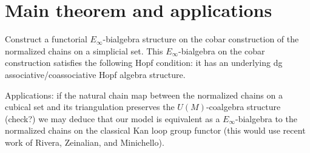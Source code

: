 \section{Main theorem and applications}

Construct a functorial $E_{\infty}$-bialgebra structure on the cobar construction of the normalized chains on a simplicial set. This $E_{\infty}$-bialgebra on the cobar construction satisfies the following Hopf condition: it has an underlying dg associative/coassociative Hopf algebra structure. 





Applications: if the natural chain map between the normalized chains on a cubical set and its triangulation preserves the $U(M)$-coalgebra structure (check?) we may deduce that our model is equivalent as a $E_{\infty}$-bialgebra to the normalized chains on the classical Kan loop group functor (this would use recent work of Rivera, Zeinalian, and Minichello).